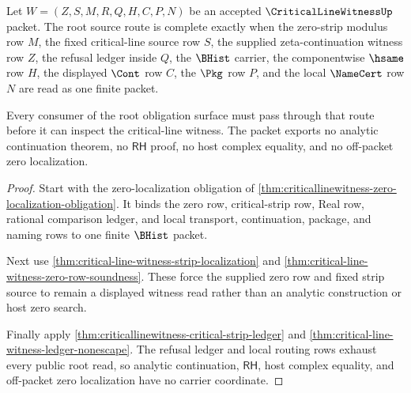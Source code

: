 \begin{theorem}
\label{thm:critical-line-witness-root-source-route-completion}
Let $W=(Z,S,M,R,Q,H,C,P,N)$ be an accepted $\CriticalLineWitnessUp$ packet. The root source route is complete exactly when the zero-strip modulus row $M$, the fixed critical-line source row $S$, the supplied zeta-continuation witness row $Z$, the refusal ledger inside $Q$, the $\BHist$ carrier, the componentwise $\hsame$ row $H$, the displayed $\Cont$ row $C$, the $\Pkg$ row $P$, and the local $\NameCert$ row $N$ are read as one finite packet.

Every consumer of the root obligation surface must pass through that route before it can inspect the critical-line witness. The packet exports no analytic continuation theorem, no $\mathsf{RH}$ proof, no host complex equality, and no off-packet zero localization.
\end{theorem}
\begin{proof}
Start with the zero-localization obligation of \autoref{thm:criticallinewitness-zero-localization-obligation}. It binds the zero row, critical-strip row, Real row, rational comparison ledger, and local transport, continuation, package, and naming rows to one finite $\BHist$ packet.

Next use \autoref{thm:critical-line-witness-strip-localization} and \autoref{thm:critical-line-witness-zero-row-soundness}. These force the supplied zero row and fixed strip source to remain a displayed witness read rather than an analytic construction or host zero search.

Finally apply \autoref{thm:criticallinewitness-critical-strip-ledger} and \autoref{thm:critical-line-witness-ledger-nonescape}. The refusal ledger and local routing rows exhaust every public root read, so analytic continuation, $\mathsf{RH}$, host complex equality, and off-packet zero localization have no carrier coordinate.
\end{proof}

